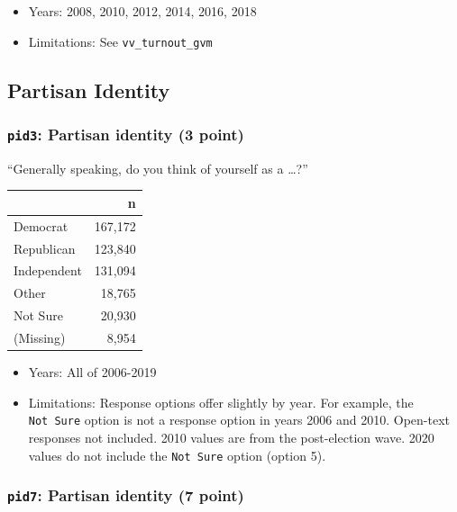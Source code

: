 \documentclass[10pt,article,oneside]{memoir}
\theoremstyle{definition}
\begin{document}
\begin{itemize}
\tightlist
\item
  Years: 2008, 2010, 2012, 2014, 2016, 2018
\item
  Limitations: See \texttt{vv\_turnout\_gvm}
\end{itemize}

\newpage

\hypertarget{partisan-identity}{%
\subsection{Partisan Identity}\label{partisan-identity}}

\hypertarget{pid3-partisan-identity-3-point}{%
\subsubsection{\texorpdfstring{\texttt{pid3}: Partisan identity (3
point)}{pid3: Partisan identity (3 point)}}\label{pid3-partisan-identity-3-point}}

``Generally speaking, do you think of yourself as a \ldots?''

\begin{table}[H]
\centering
\begin{tabular}{lr}
\toprule
 & n\\
\midrule
Democrat & 167,172\\
Republican & 123,840\\
Independent & 131,094\\
Other & 18,765\\
Not Sure & 20,930\\
(Missing) & 8,954\\
\bottomrule
\end{tabular}
\end{table}

\begin{itemize}
\tightlist
\item
  Years: All of 2006-2019
\item
  Limitations: Response options offer slightly by year. For example, the
  \texttt{Not\ Sure} option is not a response option in years 2006 and
  2010. Open-text responses not included. 2010 values are from the
  post-election wave. 2020 values do not include the \texttt{Not\ Sure}
  option (option 5).
\end{itemize}

\hypertarget{pid7-partisan-identity-7-point}{%
\subsubsection{\texorpdfstring{\texttt{pid7}: Partisan identity (7
point)}{pid7: Partisan identity (7 point)}}\label{pid7-partisan-identity-7-point}}
\end{document}

